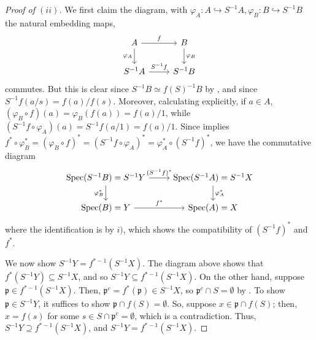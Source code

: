 \documentclass[12pt,letterpaper]{article}
\theoremstyle{definition}
\theoremstyle{remark}
\numberwithin{equation}{section}
\numberwithin{figure}{problem}
\DeclareMathOperator{\Spec}{Spec}
\begin{document}
\begin{proof}[Proof of $(ii)$]
  We first claim the diagram, with $\varphi_A\colon A \hookrightarrow S^{-1}A, \varphi_B\colon B \hookrightarrow S^{-1}B$ the natural embedding maps,
  \begin{equation*}
    \begin{tikzcd}
      A \arrow{r}{f}\arrow{d}[swap]{\varphi_A} & B \arrow{d}{\varphi_B}\\
      S^{-1}A \arrow{r}{S^{-1}f} & S^{-1}B
    \end{tikzcd}
  \end{equation*}
  commutes. But this is clear since $S^{-1}B \simeq f(S)^{-1}B$ by \cite[Exc.~3.4]{AM69}, and since $S^{-1}f(a/s) = f(a)/f(s)$. Moreover, calculating explicitly, if $a \in A$, $(\varphi_B \circ f) (a) = \varphi_B (f(a)) = f(a)/1$, while $(S^{-1}f \circ \varphi_A)(a) = S^{-1}f (a/1) = f(a)/1$. Since \cite[Exc.~1.21]{AM69} implies $f^* \circ \varphi_B^* = (\varphi_B \circ f)^* = (S^{-1}f \circ \varphi_A)^* = \varphi_A^* \circ (S^{-1}f)^*$, we have the commutative diagram
  \begin{equation*}
    \begin{tikzcd}
      \Spec(S^{-1}B) = S^{-1}Y \arrow{r}{(S^{-1}f)^*}\arrow{d}[swap]{\varphi_B^*} & \Spec(S^{-1}A) = S^{-1}X \arrow{d}{\varphi_A^*}\\
      \Spec(B) = Y \arrow{r}{f^*} & \Spec(A) = X
    \end{tikzcd}
  \end{equation*}
  where the identification is by $i)$, which shows the compatibility of $(S^{-1}f)^*$ and $f^*$.
  \par We now show $S^{-1}Y = f^{*-1}(S^{-1}X)$. The diagram above shows that $f^*(S^{-1}Y) \subseteq S^{-1}X$, and so $S^{-1}Y \subseteq f^{*-1}(S^{-1}X)$. On the other hand, suppose $\mathfrak{p} \in f^{*-1}(S^{-1}X)$. Then, $\mathfrak{p}^c = f^*(\mathfrak{p}) \in S^{-1}X$, so $\mathfrak{p}^c \cap S = \emptyset$ by \cite[Prop.~3.11iv]{AM69}. To show $\mathfrak{p} \in S^{-1}Y$, it suffices to show $\mathfrak{p} \cap f(S) = \emptyset$. So, suppose $x \in \mathfrak{p} \cap f(S)$; then, $x = f(s)$ for some $s \in S \cap \mathfrak{p}^c = \emptyset$, which is a contradiction. Thus, $S^{-1}Y \supseteq f^{*-1}(S^{-1}X)$, and $S^{-1}Y = f^{*-1}(S^{-1}X)$.
\end{proof}
\end{document}
